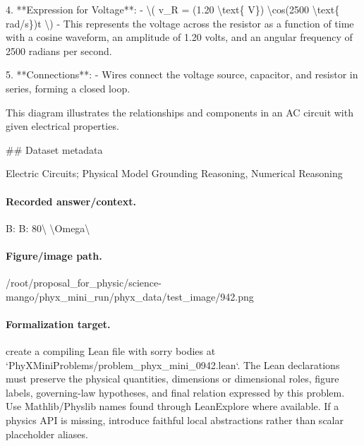 4. **Expression for Voltage**:
   - \textbackslash{}( v\_R = (1.20 \textbackslash{}text\{ V\}) \textbackslash{}cos(2500 \textbackslash{}text\{ rad/s\})t \textbackslash{})
   - This represents the voltage across the resistor as a function of time with a cosine waveform, an amplitude of 1.20 volts, and an angular frequency of 2500 radians per second.

5. **Connections**:
   - Wires connect the voltage source, capacitor, and resistor in series, forming a closed loop.

This diagram illustrates the relationships and components in an AC circuit with given electrical properties.

\#\# Dataset metadata

Electric Circuits; Physical Model Grounding Reasoning, Numerical Reasoning

\paragraph{Recorded answer/context.}
B: B: 80\textbackslash{} \textbackslash{}Omega\textbackslash{}

\paragraph{Figure/image path.}
/root/proposal\_for\_physic/science-mango/phyx\_mini\_run/phyx\_data/test\_image/942.png

\paragraph{Formalization target.}
create a compiling Lean file with sorry bodies at `PhyXMiniProblems/problem\_phyx\_mini\_0942.lean`. The Lean declarations must preserve the physical quantities, dimensions or dimensional roles, figure labels, governing-law hypotheses, and final relation expressed by this problem.
Use Mathlib/Physlib names found through LeanExplore where available. If a physics API is missing, introduce faithful local abstractions rather than scalar placeholder aliases.

